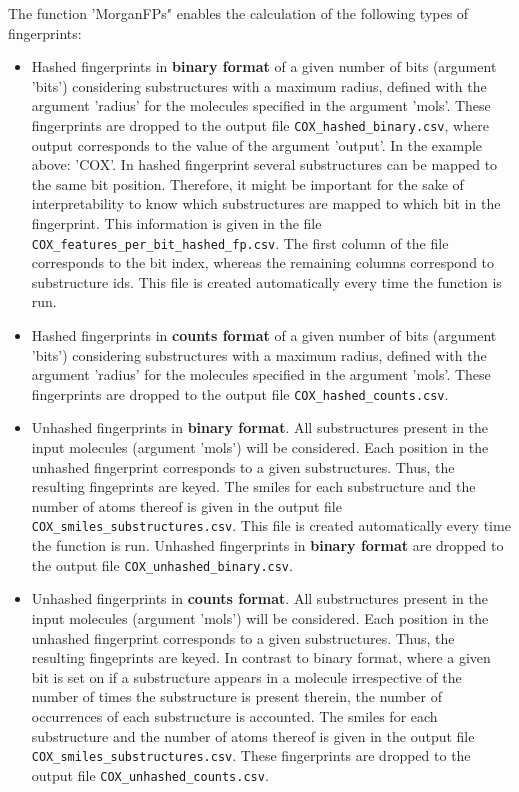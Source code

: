 \documentclass[twoside,a4wide,12pt]{article}\usepackage[]{graphicx}\usepackage[]{color}
\begin{document}
The function 'MorganFPs" enables the calculation of the following types of fingerprints:
\begin{itemize}

\item Hashed fingerprints in {\bf binary format} of a given number of bits (argument 'bits') considering substructures with a maximum radius, defined with the argument 'radius' for the molecules specified in the argument 'mols'. These fingerprints are dropped to the output file \verb|COX_hashed_binary.csv|, where output corresponds to the value of the argument 'output'. In the example above: 'COX'. 
In hashed fingerprint several substructures can be mapped to the same bit position.
Therefore, it might be important for the sake of interpretability to know which substructures are mapped to which bit in the fingerprint. This information is given in the file \verb|COX_features_per_bit_hashed_fp.csv|.
The first column of the file corresponds to the bit index, whereas the remaining columns correspond to substructure ids.
This file is created automatically every time the function is run.

\item Hashed fingerprints in {\bf counts format} of a given number of bits (argument 'bits') considering substructures with a maximum radius, defined with the argument 'radius' for the molecules specified in the argument 'mols'. These fingerprints are dropped to the output file \verb|COX_hashed_counts.csv|.

\item Unhashed fingerprints in {\bf binary format}. All substructures present in the input molecules (argument 'mols') will be considered. Each position in the unhashed fingerprint corresponds to a given substructures. Thus, the resulting fingeprints are keyed. The smiles for each substructure and the number of atoms thereof is given in the output file \verb|COX_smiles_substructures.csv|. This file is created automatically every time the function is run. 
Unhashed fingerprints in {\bf binary format} are dropped to the output file \verb|COX_unhashed_binary.csv|.

\item Unhashed fingerprints in {\bf counts format}. All substructures present in the input molecules (argument 'mols') will be considered. Each position in the unhashed fingerprint corresponds to a given substructures. Thus, the resulting fingeprints are keyed. In contrast to binary format, where a given bit is set on if a substructure appears in a molecule irrespective of the number of times the substructure is present therein, the number of occurrences of each substructure is accounted. The smiles for each substructure and the number of atoms thereof is given in the output file \verb|COX_smiles_substructures.csv|. These fingerprints are dropped to the output file \verb|COX_unhashed_counts.csv|.


\end{itemize}
\end{document}

